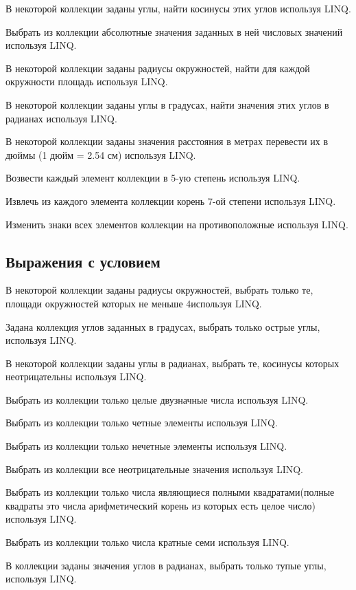 \task В некоторой коллекции заданы углы, найти косинусы этих углов
используя LINQ.

\task Выбрать из коллекции абсолютные значения заданных в ней числовых
значений используя LINQ.

\task В некоторой коллекции заданы радиусы окружностей, найти для
каждой окружности площадь используя LINQ.

\task В некоторой коллекции заданы углы в градусах, найти значения
этих углов в радианах используя LINQ.

\task В некоторой коллекции заданы значения расстояния в метрах
перевести их в дюймы (1 дюйм = 2.54 см) используя LINQ.

\task Возвести каждый элемент коллекции в 5-ую степень используя LINQ.

\task Извлечь из каждого элемента коллекции корень 7-ой степени
используя LINQ.

\task Изменить знаки всех элементов коллекции на противоположные
используя LINQ.


\subsection{Выражения с условием}

\task В некоторой коллекции заданы радиусы окружностей, выбрать только
те, площади окружностей которых не меньше 4используя LINQ.

\task Задана коллекция углов заданных в градусах, выбрать только
острые углы, используя LINQ.

\task В некоторой коллекции заданы углы в радианах, выбрать те,
косинусы которых неотрицательны используя LINQ.

\task Выбрать из коллекции только целые двузначные числа используя
LINQ.

\task Выбрать из коллекции только четные элементы используя LINQ.

\task Выбрать из коллекции только нечетные элементы используя LINQ.

\task Выбрать из коллекции все неотрицательные значения используя
LINQ.

\task Выбрать из коллекции только числа являющиеся полными
квадратами(полные квадраты это числа арифметический корень из которых
есть целое число) используя LINQ.

\task Выбрать из коллекции только числа кратные семи используя LINQ.

\task В коллекции заданы значения углов в радианах, выбрать только
тупые углы, используя LINQ.
